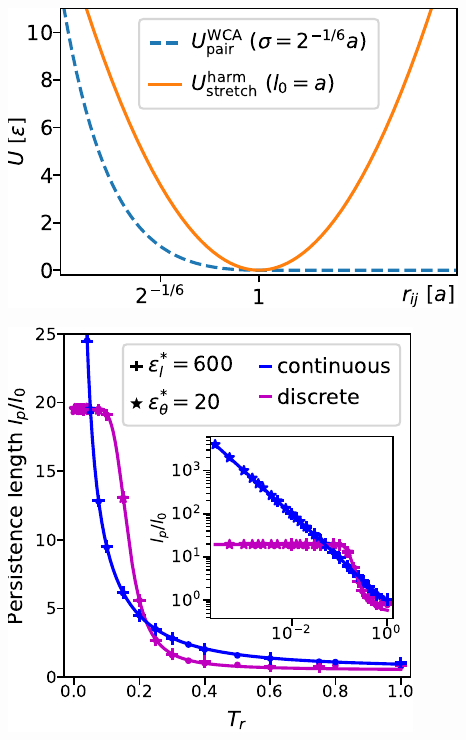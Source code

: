 \documentclass[aspectratio=169]{beamer}
\begin{document}
\begin{frame}[c]{}

  \centering
  \includegraphics[height=\textheight]{../figures/ch5_soft_from_diss/fig-WCA_vs_harmStretch/fig-WCA_vs_harmStretch.pdf}

\end{frame}

\begin{frame}[c]{}

  \centering
  \includegraphics[height=\textheight]{../figures/fig-all_lp_vs_T/fig-lp_vs_T.pdf}

\end{frame}
\end{document}
